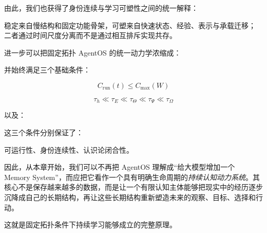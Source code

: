 由此，我们也获得了身份连续与学习可塑性之间的统一解释：

\begin{statementbox}
稳定来自慢结构和固定功能骨架，可塑来自快速状态、经验、表示与承载迁移；
二者通过时间尺度分离而不是通过相互排斥实现共存。
\end{statementbox}

进一步可以把固定拓扑 AgentOS 的统一动力学浓缩成：

\begin{statementbox}
\centering
{}
\end{statementbox}

并始终满足三个基础条件：

\[
\boxed{
C_{\mathrm{run}}(t)
\leq
C_{\max}(W)
}
\]

\[
\boxed{
\tau_h
\ll
\tau_E
\ll
\tau_\Theta
\ll
\tau_\Psi
\ll
\tau_\Omega
}
\]

以及：

\begin{statementbox}
\centering
{}
\end{statementbox}

这三个条件分别保证了：

\begin{statementbox}
可运行性、身份连续性、认识论闭合性。
\end{statementbox}

因此，从本章开始，我们可以不再把 AgentOS 理解成“给大模型增加一个 Memory System”，而应把它看作一个具有明确生命周期的\emph{持续认知动力系统}。其核心不是保存越来越多的数据，而是让一个有限认知主体能够把现实中的经历逐步沉降成自己的长期结构，再让这些长期结构重新塑造未来的观察、目标、选择和行动。

这就是固定拓扑条件下持续学习能够成立的完整原理。
